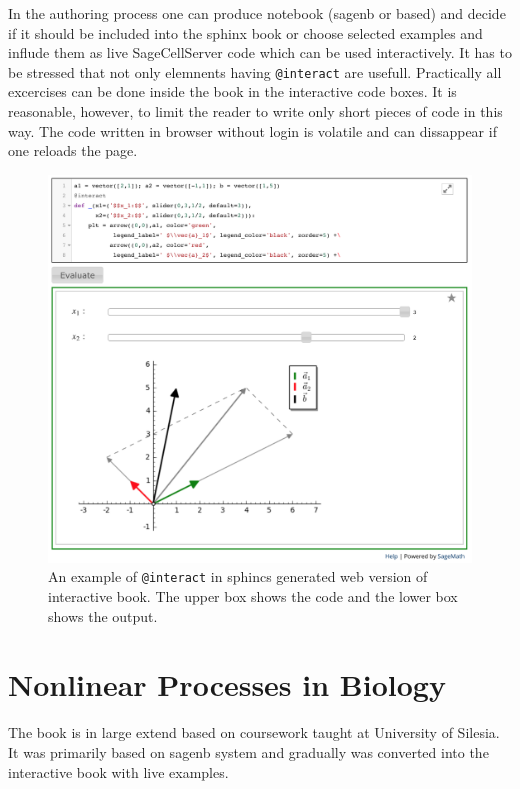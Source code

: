 \documentclass{deliverablereport}
\begin{document}
In the authoring process one can produce notebook (sagenb or \Jupyter
based) and decide if it should be included into the sphinx book or
choose selected examples and influde them as live SageCellServer code
which can be used interactively. It has to be stressed that not only
elemnents having \texttt{@interact} are usefull. Practically all 
excercises can be done inside the book in the interactive code
boxes. It is reasonable, however, to limit the reader to write only
short pieces of code in this way.  The code written in browser without
login is volatile and can dissappear if one reloads the page.

\begin{figure}
\centerline{\includegraphics[width=1.0\textwidth]{interact_in_sphinx.png}}
\caption{\label{fig:jupyterdemo} An example of \texttt{@interact} in
  sphincs generated web version of interactive book. The upper box
  shows the code and the lower box shows the output.}
\end{figure}


\section{ Nonlinear Processes in Biology }

The book is in large extend based on coursework taught at University
of Silesia. It was primarily based on sagenb system and gradually was
converted into the interactive book with live examples.
\end{document}
